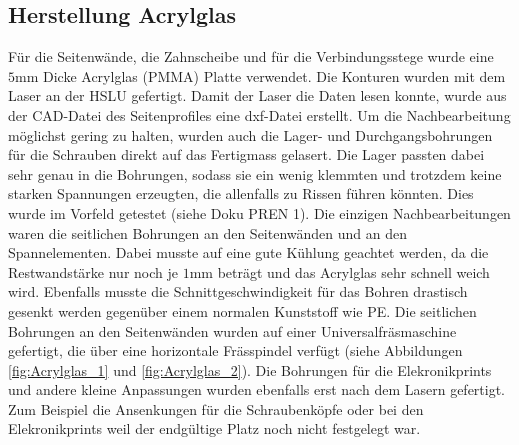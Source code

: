     \subsection{Herstellung Acrylglas}
		Für die Seitenwände, die Zahnscheibe und für die Verbindungsstege wurde eine 
		$5\si{\milli\meter}$ Dicke Acrylglas (PMMA) Platte verwendet. Die Konturen 
		wurden mit dem Laser an der HSLU gefertigt. Damit der Laser die Daten lesen 
		konnte, wurde aus der CAD-Datei des Seitenprofiles eine dxf-Datei erstellt. Um die Nachbearbeitung 
		möglichst gering zu halten, wurden auch die Lager- und Durchgangsbohrungen 
		für die Schrauben direkt auf das Fertigmass gelasert. Die Lager passten dabei 
		sehr genau in die Bohrungen, sodass sie ein wenig klemmten und trotzdem keine 
		starken Spannungen erzeugten, die allenfalls zu Rissen führen könnten. Dies 
		wurde im Vorfeld getestet (siehe Doku PREN 1). Die einzigen Nachbearbeitungen 
		waren die seitlichen Bohrungen an den Seitenwänden und an den Spannelementen. 
		Dabei musste auf eine gute Kühlung geachtet werden, da die Restwandstärke nur 
		noch je $1\si{\milli\meter}$ beträgt und das Acrylglas sehr schnell weich wird. 
		Ebenfalls musste die Schnittgeschwindigkeit für das Bohren drastisch gesenkt 
		werden gegenüber einem normalen Kunststoff wie PE. Die seitlichen Bohrungen an 
		den Seitenwänden wurden auf einer Universalfräsmaschine gefertigt, die über eine 
		horizontale Frässpindel verfügt (siehe Abbildungen \ref{fig:Acrylglas_1} und 
		\ref{fig:Acrylglas_2}). Die Bohrungen für die 
		Elekronikprints und andere kleine Anpassungen wurden ebenfalls erst nach dem 
		Lasern gefertigt. Zum Beispiel die Ansenkungen für die Schraubenköpfe oder bei 
		den Elekronikprints weil der endgültige Platz noch nicht festgelegt war.
